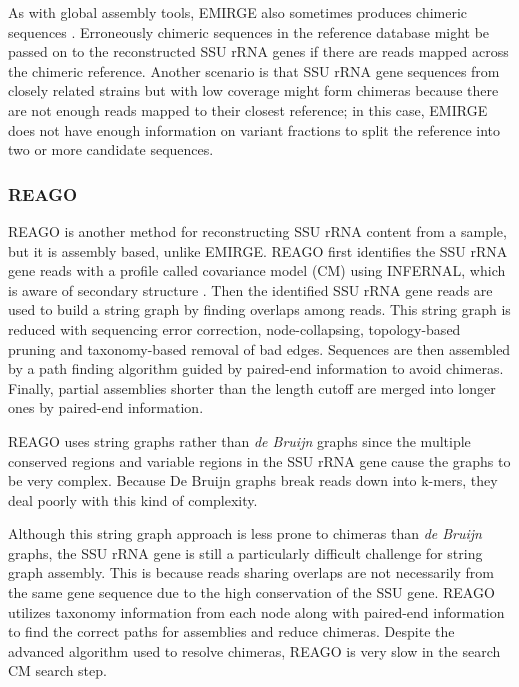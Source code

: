 \documentclass[]{msu-thesis}
\begin{document}
As with global assembly tools, EMIRGE also sometimes produces chimeric
sequences \cite{rajeev_dynamic_2013}. Erroneously chimeric sequences in
the reference database might be passed on to the reconstructed SSU rRNA
genes if there are reads mapped across the chimeric reference. Another
scenario is that SSU rRNA gene sequences from closely related strains
but with low coverage might form chimeras because there are not enough
reads mapped to their closest reference; in this case, EMIRGE does not
have enough information on variant fractions to split the reference into
two or more candidate sequences.

\subsubsection{REAGO} 
REAGO \cite{yuan_reconstructing_2015} is another method for reconstructing SSU rRNA content from a sample,
but it is assembly based, unlike EMIRGE.
REAGO first identifies the SSU rRNA gene reads with a profile called
covariance model (CM) using INFERNAL, which is aware of secondary structure
\cite{nawrocki_infernal_2009}. Then the identified SSU rRNA gene
reads are used to build a string graph by finding overlaps among reads.
This string graph is reduced with 
sequencing error correction, node-collapsing, topology-based pruning
and taxonomy-based removal of bad edges. Sequences are then assembled by
a path finding algorithm guided by paired-end information to avoid
chimeras. Finally, partial assemblies shorter than the length cutoff
are merged into longer ones by paired-end information.

REAGO uses string graphs rather than \textit{de Bruijn} graphs since
the multiple conserved regions and variable regions in the SSU rRNA
gene cause the
graphs to be very complex. Because De Bruijn graphs break reads down
into k-mers, they deal poorly with this kind of complexity.

Although this string graph approach is less prone to chimeras than
\textit{de Bruijn} graphs, the SSU rRNA gene is still a particularly
difficult challenge for string graph assembly.  This is because reads sharing
overlaps are not necessarily from the same gene sequence
due to the high conservation of the SSU gene. REAGO utilizes taxonomy
information from each node along with paired-end information to find the
correct paths for assemblies and reduce chimeras. Despite the
advanced algorithm used to resolve chimeras, REAGO is very slow in the
search CM search step.
\end{document}
